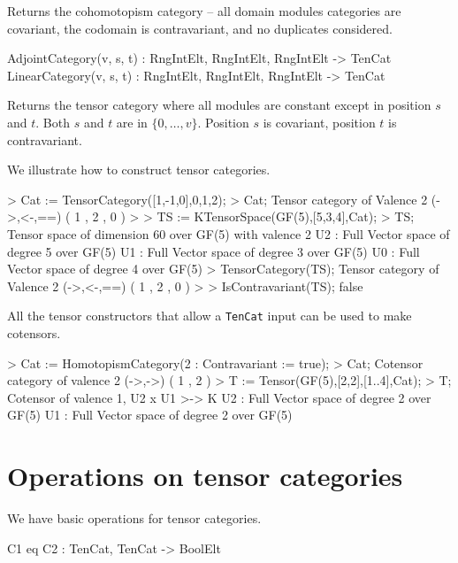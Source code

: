 Returns the cohomotopism category -- all domain modules categories are 
covariant, the codomain is contravariant, and no duplicates considered.

\begin{intrinsics}
AdjointCategory(v, s, t) :  RngIntElt, RngIntElt, RngIntElt -> TenCat
LinearCategory(v, s, t) :  RngIntElt, RngIntElt, RngIntElt -> TenCat
\end{intrinsics}

Returns the tensor category where all modules are constant except in position 
$s$ and $t$.  Both $s$ and $t$ are in $\{0,\dots, v\}$.
Position $s$ is covariant, position $t$ is contravariant.

\begin{example}
We illustrate how to construct tensor categories.

\begin{code}
> Cat := TensorCategory([1,-1,0],{{0},{1},{2}});
> Cat;
Tensor category of Valence 2 (->,<-,==) ({ 1 },{ 2 },{ 0 })
> 
> TS := KTensorSpace(GF(5),[5,3,4],Cat);
> TS;
Tensor space of dimension 60 over GF(5) with valence 2
U2 : Full Vector space of degree 5 over GF(5)
U1 : Full Vector space of degree 3 over GF(5)
U0 : Full Vector space of degree 4 over GF(5)
> TensorCategory(TS);
Tensor category of Valence 2 (->,<-,==) ({ 1 },{ 2 },{ 0 })
> 
> IsContravariant(TS);
false
\end{code}

All the tensor constructors that allow a {\tt TenCat} input can be used to make cotensors.

\begin{code}
> Cat := HomotopismCategory(2 : Contravariant := true);
> Cat;
Cotensor category of valence 2 (->,->) ({ 1 },{ 2 })
> T := Tensor(GF(5),[2,2],[1..4],Cat);
> T;
Cotensor of valence 1, U2 x U1 >-> K
U2 : Full Vector space of degree 2 over GF(5)
U1 : Full Vector space of degree 2 over GF(5)
\end{code}
\end{example}

\section{Operations on tensor categories}

We have basic operations for tensor categories.

\begin{intrinsics}
C1 eq C2 : TenCat, TenCat -> BoolElt
\end{intrinsics}

